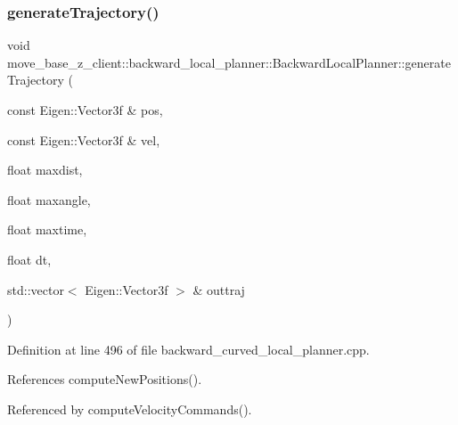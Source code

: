 \mbox{\label{classmove__base__z__client_1_1backward__local__planner_1_1BackwardLocalPlanner_a5da53f29e43639a9af5ba3b640e6bf8c}} 
\subsubsection{\texorpdfstring{generate\+Trajectory()}{generateTrajectory()}}
{\footnotesize\ttfamily void move\+\_\+base\+\_\+z\+\_\+client\+::backward\+\_\+local\+\_\+planner\+::\+Backward\+Local\+Planner\+::generate\+Trajectory (\begin{DoxyParamCaption}\item[{const Eigen\+::\+Vector3f \&}]{pos,  }\item[{const Eigen\+::\+Vector3f \&}]{vel,  }\item[{float}]{maxdist,  }\item[{float}]{maxangle,  }\item[{float}]{maxtime,  }\item[{float}]{dt,  }\item[{std\+::vector$<$ Eigen\+::\+Vector3f $>$ \&}]{outtraj }\end{DoxyParamCaption})\hspace{0.3cm}{\ttfamily [private]}}



Definition at line 496 of file backward\+\_\+curved\+\_\+local\+\_\+planner.\+cpp.



References compute\+New\+Positions().



Referenced by compute\+Velocity\+Commands().


